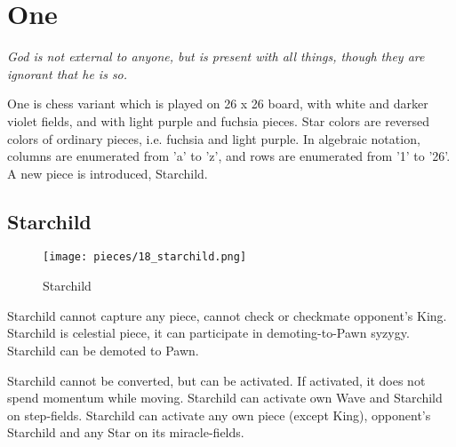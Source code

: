 

\chapter*{One}
\label{ch:One}

\begin{flushright}
\parbox{0.8\textwidth}{
\emph{God is not external to anyone, but is present with all things, though
they are ignorant that he is so. \\
 } }
\end{flushright}

\noindent
One is chess variant which is played on 26 x 26 board, with white and
darker violet fields, and with light purple and fuchsia pieces. Star
colors are reversed colors of ordinary pieces, i.e. fuchsia and light
purple. In algebraic notation, columns are enumerated from 'a' to 'z',
and rows are enumerated from '1' to '26'. A new piece is introduced,
Starchild.

\clearpage %

\section*{Starchild}
\label{sec:One/Starchild}

\noindent
\begin{wrapfigure}[11]{l}{0.4\textwidth}
\centering
\texttt{[image: pieces/18\_starchild.png]}
\caption{Starchild}
\label{fig:18_starchild}
\end{wrapfigure}
Starchild cannot capture any piece, cannot check or checkmate opponent's King.
Starchild is celestial piece, it can participate in demoting-to-Pawn syzygy.
Starchild can be demoted to Pawn.

Starchild cannot be converted, but can be activated. If activated, it does not spend
momentum while moving. Starchild can activate own Wave and Starchild on step-fields.
Starchild can activate any own piece (except King), opponent's Starchild and any Star
on its miracle-fields.

